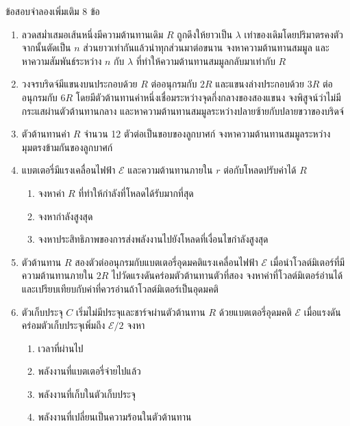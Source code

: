\begin{exercisebox}{ข้อสอบจำลองเพิ่มเติม 8 ข้อ}
\begin{enumerate}
    \item ลวดสม่ำเสมอเส้นหนึ่งมีความต้านทานเดิม $R$ ถูกดึงให้ยาวเป็น $\lambda$ เท่าของเดิมโดยปริมาตรคงตัว จากนั้นตัดเป็น $n$ ส่วนยาวเท่ากันแล้วนำทุกส่วนมาต่อขนาน จงหาความต้านทานสมมูล และหาความสัมพันธ์ระหว่าง $n$ กับ $\lambda$ ที่ทำให้ความต้านทานสมมูลกลับมาเท่ากับ $R$

    \item วงจรบริดจ์มีแขนงบนประกอบด้วย $R$ ต่ออนุกรมกับ $2R$ และแขนงล่างประกอบด้วย $3R$ ต่ออนุกรมกับ $6R$ โดยมีตัวต้านทานค่าหนึ่งเชื่อมระหว่างจุดกึ่งกลางของสองแขนง จงพิสูจน์ว่าไม่มีกระแสผ่านตัวต้านทานกลาง และหาความต้านทานสมมูลระหว่างปลายซ้ายกับปลายขวาของบริดจ์

    \item ตัวต้านทานค่า $R$ จำนวน 12 ตัวต่อเป็นขอบของลูกบาศก์ จงหาความต้านทานสมมูลระหว่างมุมตรงข้ามกันของลูกบาศก์

    \item แบตเตอรี่มีแรงเคลื่อนไฟฟ้า $\mathcal E$ และความต้านทานภายใน $r$ ต่อกับโหลดปรับค่าได้ $R$
    \begin{enumerate}
        \item จงหาค่า $R$ ที่ทำให้กำลังที่โหลดได้รับมากที่สุด
        \item จงหากำลังสูงสุด
        \item จงหาประสิทธิภาพของการส่งพลังงานไปยังโหลดที่เงื่อนไขกำลังสูงสุด
    \end{enumerate}

    \item ตัวต้านทาน $R$ สองตัวต่ออนุกรมกับแบตเตอรี่อุดมคติแรงเคลื่อนไฟฟ้า $\mathcal E$ เมื่อนำโวลต์มิเตอร์ที่มีความต้านทานภายใน $2R$ ไปวัดแรงดันคร่อมตัวต้านทานตัวที่สอง จงหาค่าที่โวลต์มิเตอร์อ่านได้ และเปรียบเทียบกับค่าที่ควรอ่านถ้าโวลต์มิเตอร์เป็นอุดมคติ

    \item ตัวเก็บประจุ $C$ เริ่มไม่มีประจุและชาร์จผ่านตัวต้านทาน $R$ ด้วยแบตเตอรี่อุดมคติ $\mathcal E$ เมื่อแรงดันคร่อมตัวเก็บประจุเพิ่มถึง $\mathcal E/2$ จงหา
    \begin{enumerate}
        \item เวลาที่ผ่านไป
        \item พลังงานที่แบตเตอรี่จ่ายไปแล้ว
        \item พลังงานที่เก็บในตัวเก็บประจุ
        \item พลังงานที่เปลี่ยนเป็นความร้อนในตัวต้านทาน
    \end{enumerate}


\end{enumerate}
\end{exercisebox}
